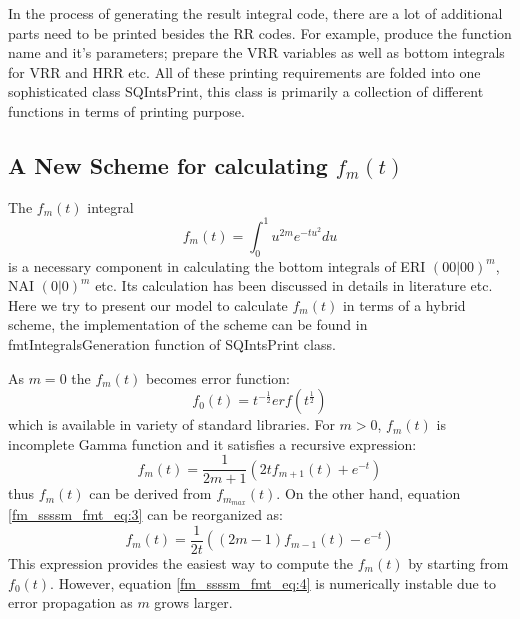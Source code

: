 In the process of generating the result integral code, there are a lot of 
additional parts need to be printed besides the RR codes. For example,
produce the function name and it's parameters; prepare the VRR variables
as well as bottom integrals for VRR and HRR etc. All of these printing 
requirements are folded into one sophisticated class SQIntsPrint, this 
class is primarily a collection of different functions in terms of 
printing purpose. 

\subsection{A New Scheme for calculating $f_{m}(t)$}
\label{fmt}

The $f_{m}(t)$ integral
\begin{equation}\label{fm_ssssm_fmt_eq:1}
 f_{m}(t) = \int^{1}_{0} u^{2m} e^{-tu^{2}} du 
\end{equation}
is a necessary component in calculating the bottom integrals of ERI $(00|00)^{m}$,
NAI $(0|0)^{m}$ etc. Its calculation has been discussed in details in literature
\cite{harris1983sssm, gill1991two} etc. Here we try to present our model to calculate
$f_{m}(t)$ in terms of a hybrid scheme, the implementation of the scheme can be 
found in fmtIntegralsGeneration function of SQIntsPrint class.

As $m=0$ the $f_{m}(t)$ becomes error function:
\begin{equation}
 f_{0}(t) = t^{-\frac{1}{2}} erf(t^{\frac{1}{2}})
\label{fm_ssssm_fmt_eq:2}
\end{equation}
which is available in variety of standard libraries. For $m>0$, $f_{m}(t)$
is incomplete Gamma function and it satisfies a recursive expression:
\begin{equation}
  f_{m}(t) = \frac{1}{2m+1}\left( 2tf_{m+1}(t) + e^{-t}\right)  
 \label{fm_ssssm_fmt_eq:3}
\end{equation}
thus $f_{m}(t)$ can be derived from $f_{m_{max}}(t)$. On the other hand, equation
\ref{fm_ssssm_fmt_eq:3} can be reorganized as:
\begin{equation}
  f_{m}(t) = \frac{1}{2t}\left( (2m-1)f_{m-1}(t) - e^{-t}\right)    
 \label{fm_ssssm_fmt_eq:4}
\end{equation}
This expression provides the easiest way to compute the $f_{m}(t)$ by starting from 
$f_{0}(t)$. However, equation \ref{fm_ssssm_fmt_eq:4} is numerically instable due to
error propagation as $m$ grows larger.

